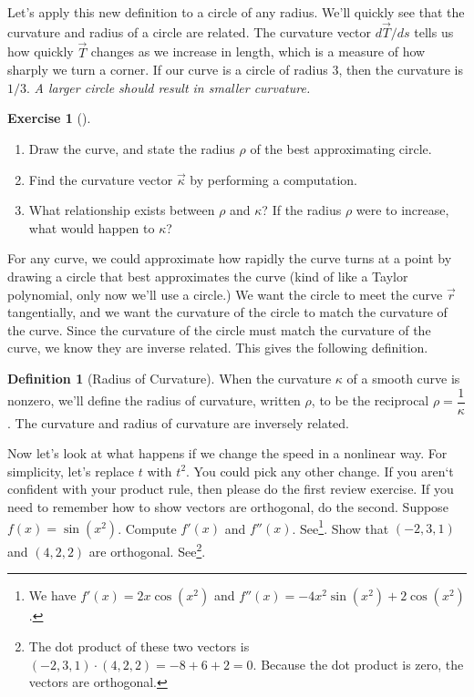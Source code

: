 \documentclass[10pt,]{book}
\theoremstyle{plain}
\theoremstyle{definition}
\newtheorem{definition}[theorem]{Definition}
\theoremstyle{definition}
\theoremstyle{definition}
\theoremstyle{definition}
\newtheorem{exploration}[project]{Exercise}
\theoremstyle{definition}
\numberwithin{equation}{section}
\begin{document}
Let's apply this new definition to a circle of any radius. We'll quickly see that the curvature and radius of a circle are related. The curvature vector \(d\vec T/ds\) tells us how quickly \(\vec T\) changes as we increase in length, which is a measure of how sharply we turn a corner. If our curve is a circle of radius \(3\), then the curvature is \(1/3\). \emph{A larger circle should result in smaller curvature.}%
\begin{exploration}[]\label{exploration-171}
\leavevmode%
\begin{enumerate}[font=\bfseries,label=(\alph*),ref=\alph*]
\item\label{task-414} Draw the curve, and state the radius \(\rho\) of the best approximating circle.%
\item\label{task-415} Find the curvature vector \(\vec \kappa\) by performing a computation.%
\item\label{task-416} What relationship exists between \(\rho\) and \(\kappa\)?  If the radius \(\rho\) were to increase, what would happen to \(\kappa\)?%
\end{enumerate}
\end{exploration}
For any curve, we could approximate how rapidly the curve turns at a point by drawing a circle that best approximates the curve (kind of like a Taylor polynomial, only now we'll use a circle.) We want the circle to meet the curve \(\vec r\) tangentially, and we want the curvature of the circle to match the curvature of the curve. Since the curvature of the circle must match the curvature of the curve, we know they are inverse related. This gives the following definition.%
\begin{definition}[{Radius of Curvature}]\label{definition-27}
When the curvature \(\kappa\) of a smooth curve is nonzero, we'll define the radius of curvature, written \(\rho\), to be the reciprocal \(\rho = \dfrac{1}{\kappa}\). The curvature and radius of curvature are inversely related.%
\end{definition}
Now let's look at what happens if we change the speed in a nonlinear way. For simplicity, let's replace \(t\) with \(t^2\). You could pick any other change. If you aren`t confident with your product rule, then please do the first review exercise. If you need to remember how to show vectors are orthogonal, do the second.%
Suppose \(f(x) = \sin(x^2)\). Compute \(f'(x)\) and \(f''(x)\). See\footnote{We have \(f'(x) = 2x\cos(x^2)\) and \(f''(x) = -4x^2\sin(x^2)+2\cos(x^2)\).\label{fn-11}}.%
Show that \((-2,3,1)\) and \((4,2,2)\) are orthogonal. See\footnote{The dot product of these two vectors is \((-2,3,1)\cdot(4,2,2) = -8+6+2=0\). Because the dot product is zero, the vectors are orthogonal.\label{fn-12}}.%
\end{document}
